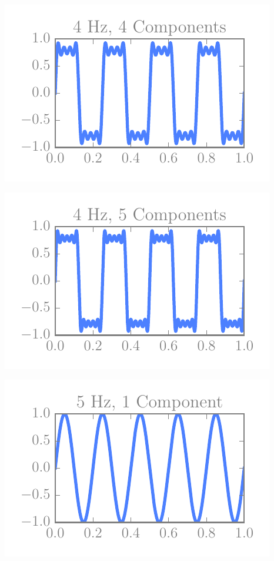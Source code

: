 \begin{multicols}{5}
\includegraphics[width=\linewidth]{../img/fouriers/4_4.pdf}

\includegraphics[width=\linewidth]{../img/fouriers/4_5.pdf}

\includegraphics[width=\linewidth]{../img/fouriers/5_1.pdf}


\end{multicols}

